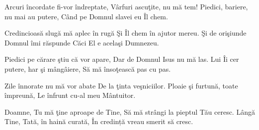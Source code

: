 
\beginverse
Arcuri încordate fi-vor îndreptate,
Vârfuri ascuţite, nu mă tem!
Piedici, bariere, nu mai au putere,
Când pe Domnul slavei eu Îl chem.
\endverse

\beginchorus
Credincioasă slugă mă aplec în rugă
Şi Îl chem în ajutor mereu.
Şi de orişiunde Domnul îmi răspunde
Căci El e acelaşi Dumnezeu.
\endchorus

\beginverse
Piedici pe cărare ştiu că vor apare,
Dar de Domnul Isus nu mă las.
Lui Îi cer putere, har şi mângâiere,
Să mă însoţească pas cu pas.
\endverse

\beginverse
Zile înnorate nu mă vor abate
De la ţinta veşniciilor.
Ploaie şi furtună, toate împreună,
Le înfrunt cu-al meu Mântuitor.
\endverse

\beginverse
Doamne, Tu mă ţine aproape de Tine,
Să mă strângi la pieptul Tău ceresc.
Lângă Tine, Tată, în haină curată,
În credință vreau smerit să cresc.
\endverse

\endsong